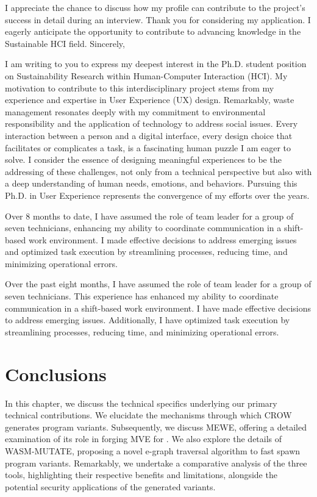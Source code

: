 I appreciate the chance to discuss how my profile can contribute to the project's success in detail during an interview. Thank you for considering my application. I eagerly anticipate the opportunity to contribute to advancing knowledge in the Sustainable HCI field.
Sincerely,



I am writing to you to express my deepest interest in the Ph.D. student position on Sustainability Research within Human-Computer Interaction (HCI). My motivation to contribute to this interdisciplinary project stems from my experience and expertise in User Experience (UX) design. Remarkably, waste management resonates deeply with my commitment to environmental responsibility and the application of technology to address social issues. Every interaction between a person and a digital interface, every design choice that facilitates or complicates a task, is a fascinating human puzzle I am eager to solve.  I consider the essence of designing meaningful experiences to be the addressing of these challenges, not only from a technical perspective but also with a deep understanding of human needs, emotions, and behaviors. Pursuing this Ph.D. in User Experience represents the convergence of my efforts over the years. 


Over 8 months to date, I have assumed the role of team leader for a group of seven technicians, enhancing my ability to coordinate communication in a shift-based work environment. I made effective decisions to address emerging issues and optimized task execution by streamlining processes, reducing time, and minimizing operational errors. 

Over the past eight months, I have assumed the role of team leader for a group of seven technicians. This experience has enhanced my ability to coordinate communication in a shift-based work environment. I have made effective decisions to address emerging issues. Additionally, I have optimized task execution by streamlining processes, reducing time, and minimizing operational errors.



\section{Conclusions}

In this chapter, we discuss the technical specifics underlying our primary technical contributions.
We elucidate the mechanisms through which CROW generates program variants.
Subsequently, we discuss MEWE, offering a detailed examination of its role in forging MVE for \Wasm. 
We also explore the details of WASM-MUTATE, proposing a novel e-graph traversal algorithm to fast spawn \wasm program variants. 
Remarkably, we undertake a comparative analysis of the three tools, highlighting their respective benefits and limitations, alongside the potential security applications of the generated \wasm variants. 


